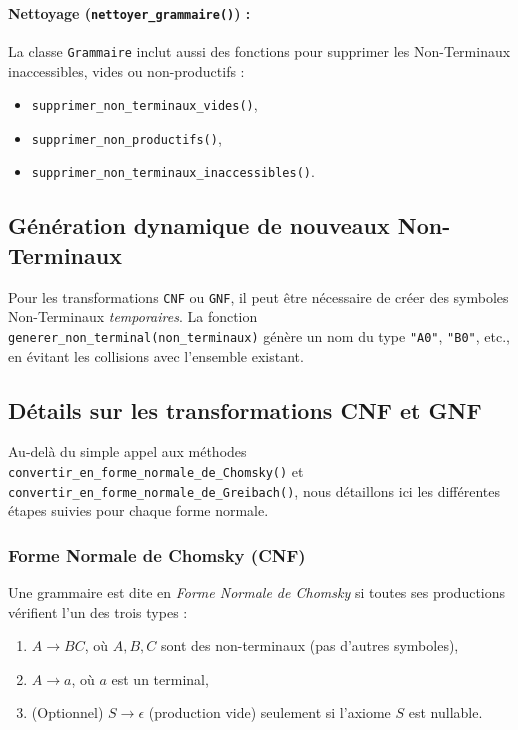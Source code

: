 \documentclass[a4paper,12pt]{article}
\begin{document}
\paragraph{Nettoyage (\texttt{nettoyer\_grammaire()}) :}
La classe \texttt{Grammaire} inclut aussi des fonctions pour supprimer les Non-Terminaux inaccessibles, vides ou non-productifs :  
\begin{itemize}
    \item \texttt{supprimer\_non\_terminaux\_vides()},
    \item \texttt{supprimer\_non\_productifs()},
    \item \texttt{supprimer\_non\_terminaux\_inaccessibles()}.
\end{itemize}

\subsection{Génération dynamique de nouveaux Non-Terminaux}
Pour les transformations \texttt{CNF} ou \texttt{GNF}, il peut être nécessaire de créer des symboles Non-Terminaux \emph{temporaires}. La fonction \texttt{generer\_non\_terminal(non\_terminaux)} génère un nom du type \texttt{"A0"}, \texttt{"B0"}, etc., en évitant les collisions avec l’ensemble existant.

\subsection{Détails sur les transformations CNF et GNF}
\label{subsec:details-cnf-gnf}

Au-delà du simple appel aux méthodes \texttt{convertir\_en\_forme\_normale\_de\_Chomsky()} et \texttt{convertir\_en\_forme\_normale\_de\_Greibach()}, nous détaillons ici les différentes étapes suivies pour chaque forme normale.

\subsubsection{Forme Normale de Chomsky (CNF)}

Une grammaire est dite en \emph{Forme Normale de Chomsky} si toutes ses productions vérifient l’un des trois types :
\begin{enumerate}
    \item \(A \to BC\), où \(A, B, C\) sont des non-terminaux (pas d’autres symboles),
    \item \(A \to a\), où \(a\) est un terminal,
    \item (Optionnel) \(S \to \epsilon\) (production vide) seulement si l’axiome \(S\) est nullable.
\end{enumerate}
\end{document}
